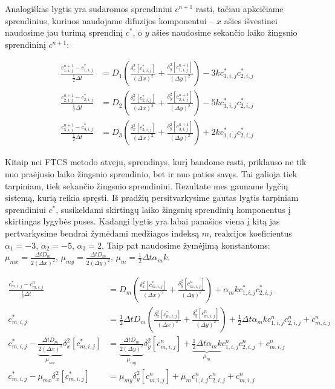 Analogiškas lygtis yra sudaromos sprendiniui $c^{n+1}$ rasti, tačiau apkeičiame sprendinius, kuriuos naudojame difuzijos komponentui -- $x$ ašies išvestinei naudosime jau turimą sprendinį $c^{*}$, o $y$ ašies naudosime sekančio laiko žingsnio sprendininį $c^{n+1}$:

\begin{subequations} \label{eqs:adi-next-step}
\begin{align}
	\frac{c^{n+1}_{1,i,j} - c^*_{1,i,j}}{\frac{1}{2}\Delta t} 
	&= D_1 \left( \frac{\delta_x^2[c^{*}_{1,i,j}]}{(\Delta x)^2} 
	+ \frac{\delta_y^2[c^{n+1}_{1,i,j}]}{(\Delta y)^2} \right) - 3kc^*_{1,i,j}c^*_{2,i,j}\\
	\frac{c^{n+1}_{2,i,j} - c^*_{2,i,j}}{\frac{1}{2}\Delta t} 
	&= D_2 \left( \frac{\delta_x^2[c^*_{2,i,j}]}{(\Delta x)^2}
	+ \frac{\delta_y^2[c^{n+1}_{2,i,j}]}{(\Delta y)^2} \right) - 5kc^*_{1,i,j}c^*_{2,i,j}\\
	\frac{c^{n+1}_{3,i,j} - c^*_{3,i,j}}{\frac{1}{2}\Delta t} 
	&= D_3 \left( \frac{\delta_x^2[c^*_{3,i,j}]}{(\Delta x)^2} 
	+ \frac{\delta_y^2[c^{n+1}_{3,i,j}]}{(\Delta y)^2} \right) +2kc^*_{1,i,j}c^*_{2,i,j}
\end{align}
\end{subequations}

\newpage

Kitaip nei FTCS metodo atveju, sprendinys, kurį bandome rasti, priklauso ne tik nuo praėjusio laiko žingsnio sprendinio, bet ir nuo paties savęs. Tai galioja tiek tarpiniam, tiek sekančio žingsnio sprendiniui. Rezultate mes gauname lygčių sistemą, kurią reikia spręsti. Iš pradžių persitvarkysime gautas lygtis tarpiniam sprendiniui $c^*$, susikeldami skirtingų laiko žingsnių sprendinių komponentus į skirtingas lygybės puses. Kadangi lygtis yra labai panašios viena į kitą jas pertvarkysime bendrai žymėdami medžiagos indeksą $m$, reakcijos koeficientus $\alpha_1 = -3$, $\alpha_2 = -5$, $\alpha_3 = 2$. Taip pat naudosime žymėjimą konstantoms: $\mu_{mx} = \frac{\Delta t D_m}{2(\Delta x)^2}$, $\mu_{my} = \frac{\Delta t D_m}{2(\Delta y)^2}$, $\mu_m = \frac{1}{2} \Delta t \alpha_m k$.

\begin{align*}
  \frac{c^{*}_{m,i,j} - c^n_{m,i,j}}{\frac{1}{2}\Delta t} 
  &= D_m \left( \frac{\delta_x^2[c^{*}_{m,i,j}]}{(\Delta x)^2} 
  + \frac{\delta_y^2[c^n_{m,i,j}]}{(\Delta y)^2} \right) 
  + \alpha_mkc^*_{1,i,j}c^*_{2,i,j} \\
  c^*_{m,i,j} 
  &= \frac{1}{2}\Delta t D_m \left( \frac{\delta_x^2[c^{*}_{m,i,j}]}{(\Delta x)^2} 
  + \frac{\delta_y^2[c^n_{m,i,j}]}{(\Delta y)^2} \right)
  + \frac{1}{2}\Delta t \alpha_m kc^n_{1,i,j}c^n_{2,i,j} + c^n_{m,i,j}\\
  c^*_{m,i,j} - \underbrace{\frac{\Delta t D_m}{2(\Delta x)^2}}_{\mu_{mx}}\delta_x^2[c^{*}_{m,i,j}] 
  &= \underbrace{\frac{\Delta t D_m}{2(\Delta y)^2}}_{\mu_{my}}\delta_y^2[c^n_{m,i,j}]
  + \underbrace{\frac{1}{2}\Delta t \alpha_m k}_{\mu_m}c^n_{1,i,j}c^n_{2,i,j} + c^n_{m,i,j}\\
  c^*_{m,i,j} - \mu_{mx}\delta_x^2[c^{*}_{m,i,j}]
  &= \mu_{my}\delta_y^2[c^n_{m,i,j}] + \mu_m c^n_{1,i,j}c^n_{2,i,j} + c^n_{m,i,j}
\end{align*}

